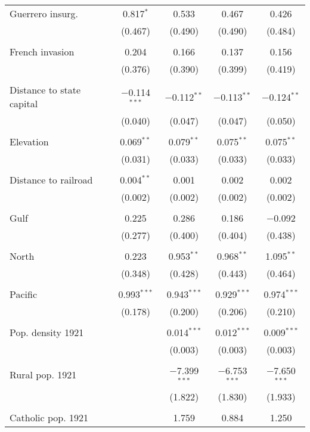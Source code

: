 \begin{table}[!htbp]
\begin{tabular}{@{\extracolsep{5pt}}lccccc}
 Guerrero insurg. &  & 0.817$^{*}$ & 0.533 & 0.467 & 0.426 \\ 
  &  & (0.467) & (0.490) & (0.490) & (0.484) \\ 
  & & & & & \\ 
 French invasion &  & 0.204 & 0.166 & 0.137 & 0.156 \\ 
  &  & (0.376) & (0.390) & (0.399) & (0.419) \\ 
  & & & & & \\ 
 Distance to state capital &  & $-$0.114$^{***}$ & $-$0.112$^{**}$ & $-$0.113$^{**}$ & $-$0.124$^{**}$ \\ 
  &  & (0.040) & (0.047) & (0.047) & (0.050) \\ 
  & & & & & \\ 
 Elevation &  & 0.069$^{**}$ & 0.079$^{**}$ & 0.075$^{**}$ & 0.075$^{**}$ \\ 
  &  & (0.031) & (0.033) & (0.033) & (0.033) \\ 
  & & & & & \\ 
 Distance to railroad &  & 0.004$^{**}$ & 0.001 & 0.002 & 0.002 \\ 
  &  & (0.002) & (0.002) & (0.002) & (0.002) \\ 
  & & & & & \\ 
 Gulf &  & 0.225 & 0.286 & 0.186 & $-$0.092 \\ 
  &  & (0.277) & (0.400) & (0.404) & (0.438) \\ 
  & & & & & \\ 
 North &  & 0.223 & 0.953$^{**}$ & 0.968$^{**}$ & 1.095$^{**}$ \\ 
  &  & (0.348) & (0.428) & (0.443) & (0.464) \\ 
  & & & & & \\ 
 Pacific &  & 0.993$^{***}$ & 0.943$^{***}$ & 0.929$^{***}$ & 0.974$^{***}$ \\ 
  &  & (0.178) & (0.200) & (0.206) & (0.210) \\ 
  & & & & & \\ 
 Pop. density 1921 &  &  & 0.014$^{***}$ & 0.012$^{***}$ & 0.009$^{***}$ \\ 
  &  &  & (0.003) & (0.003) & (0.003) \\ 
  & & & & & \\ 
 Rural pop. 1921 &  &  & $-$7.399$^{***}$ & $-$6.753$^{***}$ & $-$7.650$^{***}$ \\ 
  &  &  & (1.822) & (1.830) & (1.933) \\ 
  & & & & & \\ 
 Catholic pop. 1921 &  &  & 1.759 & 0.884 & 1.250 \\ 

\end{tabular}
\end{table}

